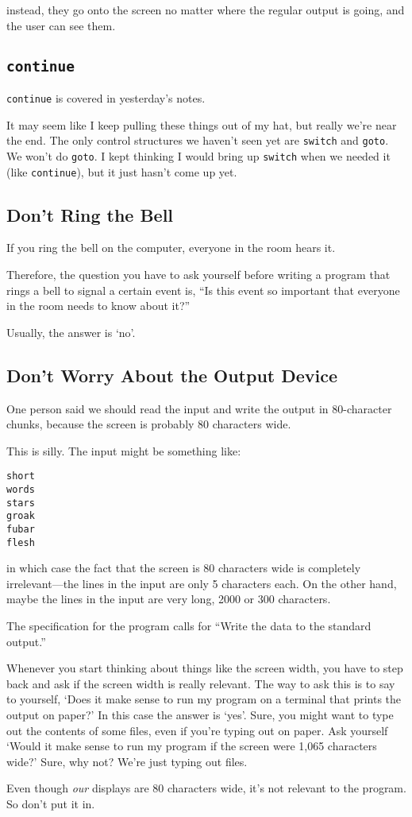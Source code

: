 \noindent instead, they go onto the screen no matter 
where the regular output is going, and the user can see them.

\subsection{{\tt continue}}

{\tt continue} is covered in yesterday's notes. 

It may seem like I keep pulling these things out of my hat, but really
we're near the end.  The only control structures we haven't seen yet are
{\tt switch}  and {\tt goto}.  We won't do {\tt goto}.  I kept thinking
I would bring up {\tt switch} when we needed it (like {\tt continue}),
but it just hasn't come up yet.

\subsection{Don't Ring the Bell}

If you ring the bell on the computer, everyone in the room hears it.

Therefore, the question you have to ask yourself before writing a
program that rings a bell to signal a certain event is, ``Is this event
so important that everyone in the room needs to know about it?''

Usually, the answer is `no'.

\subsection{Don't Worry About the Output Device}

One person said we should read the input and write the output in
80-character chunks, because the screen is probably 80 characters wide.

This is silly.  The input might be something like:

\begin{verbatim}
short
words
stars
groak
fubar
flesh
\end{verbatim}

\noindent in which case the fact that the screen is 80 characters wide is
completely irrelevant---the lines in the input are only 5 characters
each.  On the other hand, maybe the lines in the input are very long,
2000 or 300 characters.  

The specification for the program calls for ``Write the data to the
standard output.''

Whenever you start thinking about things like the screen width, you have
to step back and ask if the screen width is really relevant.  The way to
ask this is to say to yourself, `Does it make sense to run my program on
a terminal that prints the output on paper?'  In this case the answer is
`yes'.  Sure, you might want to type out the contents of some files,
even if you're typing out on paper.  Ask yourself `Would it make sense
to run my program if the screen were 1,065 characters wide?'  Sure, why
not?  We're just typing out files.

Even though {\em our}\/ displays are 80 characters wide, it's not
relevant to the program.  So don't put it in.


